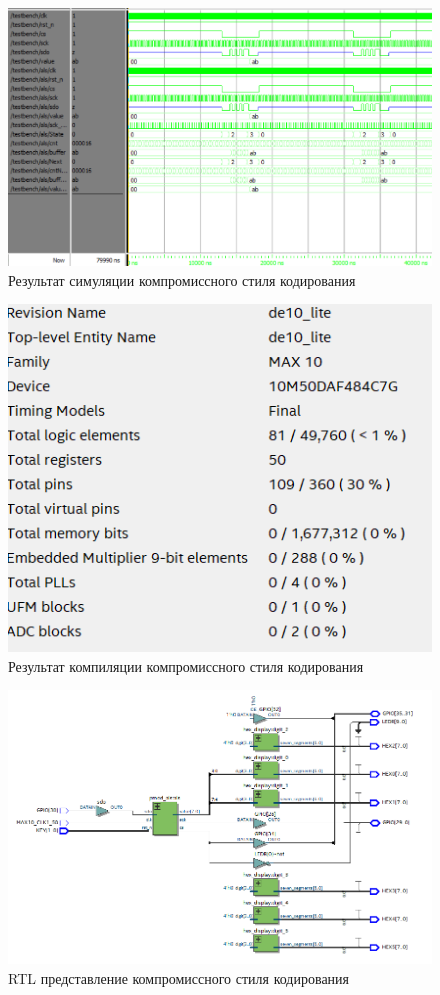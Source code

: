 \documentclass[a4paper,14pt]{article}
\begin{document}
	\begin{figure}[H]
		\centering
		\includegraphics[width=0.9\linewidth]{images/9_3_wave}
		\caption{Результат симуляции компромиссного стиля кодирования}
		\label{fig:9_3_wave}
	\end{figure}
	
	\begin{figure}[H]
		\centering
		\includegraphics[width=0.5\linewidth]{images/9_3_compilation}
		\caption{Результат компиляции компромиссного стиля кодирования}
		\label{fig:9_3_compilation}
	\end{figure}
	
	\begin{figure}[H]
		\centering
		\includegraphics[width=0.9\linewidth]{images/9_3_rtl}
		\caption{RTL представление компромиссного стиля кодирования}
		\label{fig:9_3_rtl}
	\end{figure}
	
\end{document}
